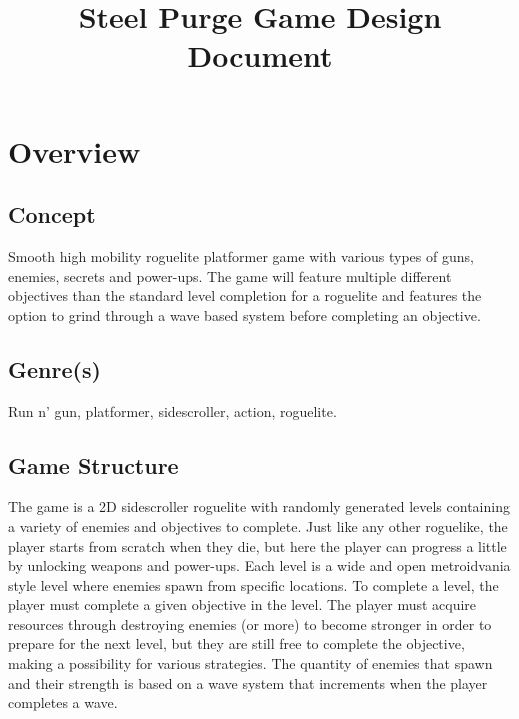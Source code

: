 \documentclass[12pt]{article}
\title{Steel Purge Game Design Document}
\begin{document}
\maketitle{}

\section{Overview}


\subsection{Concept}

Smooth high mobility roguelite platformer game with various types of guns, enemies, secrets and power-ups. The game will feature multiple different objectives than the standard level completion for a roguelite and features the option to grind through a wave based system before completing an objective. 

\subsection{Genre(s)}

Run n' gun, platformer, sidescroller, action, roguelite.

\subsection{Game Structure}

The game is a 2D sidescroller roguelite with randomly generated levels containing a variety of enemies and objectives to complete. Just like any other roguelike, the player starts from scratch when they die, but here the player can progress a little by unlocking weapons and power-ups. Each level is a wide and open metroidvania style level where enemies spawn from specific locations. To complete a level, the player must complete a given objective in the level. The player must acquire resources through destroying enemies (or more) to become stronger in order to prepare for the next level, but they are still free to complete the objective, making a possibility for various strategies. The quantity of enemies that spawn and their strength is based on a wave system that increments when the player completes a wave. 

\end{document}
